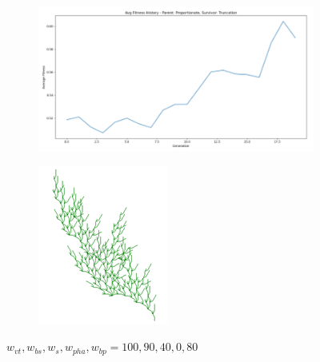 \begin{figure}[H]
    \centering
    \begin{subfigure}[b]{0.3\textwidth}
        \includegraphics[width=\textwidth]{image5.png}
    \end{subfigure}
    \begin{subfigure}[b]{0.1\textwidth}
        \includegraphics[width=\textwidth]{image7.png}
    \end{subfigure}

    \vspace{0.5cm}
    \caption{$w_{vt}, w_{bs}, w_{s}, w_{pha}, w_{bp} = 100, 90, 40, 0, 80$}
    \label{fig:mutation_comparison}
\end{figure}

